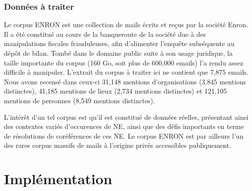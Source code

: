 \documentclass{article}
\begin{document}
\subsubsection{Données à traiter}
\par
Le corpus ENRON est une collection de mails écrits et reçus par la société Enron.
Il a été constitué au cours de la banqueroute de la société due à des manipulations fiscales frauduleuses, afin d'alimenter l'enquête subséquente au dépôt de bilan.
Tombé dans le domaine public suite à son usage juridique, la taille importante du corpus (160 Go, soit plus de 600,000 emails) l'a rendu assez difficile à manipuler.
L'extrait du corpus à traiter ici ne contient que 7,875 emails.
Nous avons recensé dans ceux-ci 31,148 mentions d'organisations (3,845 mentions distinctes), 41,185 mentions de lieux (2,734 mentions distinctes) et 121,105 mentions de personnes (8,549 mentions distinctes).
\par
L'intérêt d'un tel corpus est qu'il est constitué de données réelles, présentant ainsi des contextes variés d'occurences de NE, ainsi que des défis importants en terme de résolutions de coréférences de ces NE.
Le corpus ENRON est par ailleurs l'un des rares corpus massifs de mails à l'origine privés accessibles publiquement.

\section{Implémentation}
\end{document}
